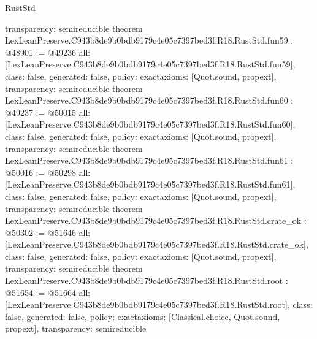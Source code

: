 \begin{lexlean}{RustStd}
\begin{coremodule}
{  transparency: semireducible
}
theorem LexLeanPreserve.C943b8de9b0bdb9179c4e05c7397bed3f.R18.RustStd.fun59 : @48901 := @49236 {
  all: [LexLeanPreserve.C943b8de9b0bdb9179c4e05c7397bed3f.R18.RustStd.fun59],
  class: false,
  generated: false,
  policy: exact{axioms: [Quot.sound, propext]},
  transparency: semireducible
}
theorem LexLeanPreserve.C943b8de9b0bdb9179c4e05c7397bed3f.R18.RustStd.fun60 : @49237 := @50015 {
  all: [LexLeanPreserve.C943b8de9b0bdb9179c4e05c7397bed3f.R18.RustStd.fun60],
  class: false,
  generated: false,
  policy: exact{axioms: [Quot.sound, propext]},
  transparency: semireducible
}
theorem LexLeanPreserve.C943b8de9b0bdb9179c4e05c7397bed3f.R18.RustStd.fun61 : @50016 := @50298 {
  all: [LexLeanPreserve.C943b8de9b0bdb9179c4e05c7397bed3f.R18.RustStd.fun61],
  class: false,
  generated: false,
  policy: exact{axioms: [Quot.sound, propext]},
  transparency: semireducible
}
theorem LexLeanPreserve.C943b8de9b0bdb9179c4e05c7397bed3f.R18.RustStd.crate_ok : @50302 := @51646 {
  all: [LexLeanPreserve.C943b8de9b0bdb9179c4e05c7397bed3f.R18.RustStd.crate_ok],
  class: false,
  generated: false,
  policy: exact{axioms: [Quot.sound, propext]},
  transparency: semireducible
}
theorem LexLeanPreserve.C943b8de9b0bdb9179c4e05c7397bed3f.R18.RustStd.root : @51654 := @51664 {
  all: [LexLeanPreserve.C943b8de9b0bdb9179c4e05c7397bed3f.R18.RustStd.root],
  class: false,
  generated: false,
  policy: exact{axioms: [Classical.choice, Quot.sound, propext]},
  transparency: semireducible
}


\end{coremodule}
\end{lexlean}
